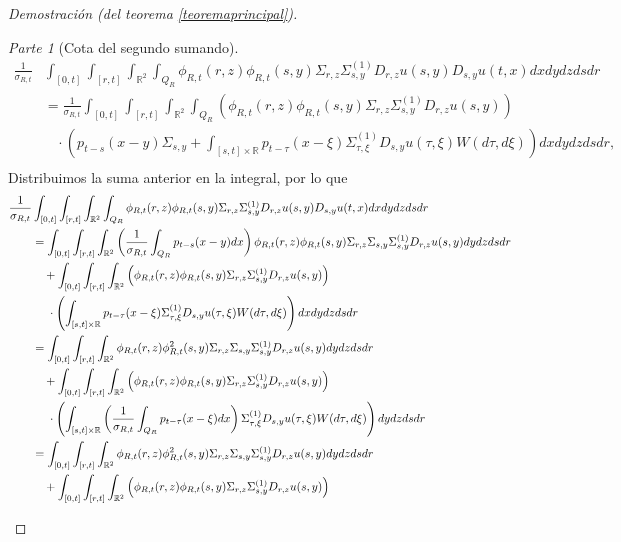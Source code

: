 \documentclass[letterpaper,twoside,12pt]{book}
\newcommand{\R}{\mathbb{R}}
\newcommand{\1}{\mathds{1}}
\theoremstyle{definition}
\theoremstyle{definition}
\theoremstyle{remark}
\newtheorem{proofpart}{Parte}
\theoremstyle{definition}
\theoremstyle{definition}
\theoremstyle{definition}
\theoremstyle{definition}
\theoremstyle{definition}
\begin{document}
\begin{proof}[Demostración (del teorema \ref{teoremaprincipal})]
\begin{proofpart}[Cota del segundo sumando]
   \begin{align*}
      \frac{1}{\sigma_{R,t}}&\int_{[0,t]}\int_{[r,t]}\int_{\R^2}\int_{Q_R}\phi_{R,t}(r,z)\phi_{R,t}(s,y)\Sigma_{r,z}\Sigma^{(1)}_{s,y}D_{r,z}u(s,y)D_{s,y}u(t,x)dx dy dz ds dr\\
      &=\frac{1}{\sigma_{R,t}}\int_{[0,t]}\int_{[r,t]}\int_{\R^2}\int_{Q_R}\left(\phi_{R,t}(r,z)\phi_{R,t}(s,y)\Sigma_{r,z}\Sigma^{(1)}_{s,y}D_{r,z}u(s,y)\right)\\
      & \ \ \ \ \cdot\left(p_{t-s}(x-y)\Sigma_{s,y}+ \int_{[s,t]\times\R} p_{t-\tau}(x-\xi)\Sigma^{(1)}_{\tau,\xi}D_{s,y}u(\tau,\xi)W(d\tau,d\xi)\right)dx dy dz ds dr,\\
   \end{align*}
   Distribuimos la suma anterior en la integral, por lo que 
   \begin{align}
      \frac{1}{\sigma_{R,t}}&\int_{[0,t]}\int_{[r,t]}\int_{\R^2}\int_{Q_R}\phi_{R,t}(r,z)\phi_{R,t}(s,y)\Sigma_{r,z}\Sigma^{(1)}_{s,y}D_{r,z}u(s,y)D_{s,y}u(t,x)dx dy dz ds dr\notag\\
      &=\int_{[0,t]}\int_{[r,t]}\int_{\R^2}\left(\frac{1}{\sigma_{R,t}}\int_{Q_R}p_{t-s}(x-y)dx\right)\phi_{R,t}(r,z)\phi_{R,t}(s,y)\Sigma_{r,z}\Sigma_{s,y}\Sigma^{(1)}_{s,y}D_{r,z}u(s,y)dy dz ds dr\notag\\
      & \ \ \ + \int_{[0,t]}\int_{[r,t]}\int_{\R^2}\left(\phi_{R,t}(r,z)\phi_{R,t}(s,y)\Sigma_{r,z}\Sigma^{(1)}_{s,y}D_{r,z}u(s,y)\right)\notag\\
      &\ \ \ \ \cdot\left(\int_{[s,t]\times\R} p_{t-\tau}(x-\xi)\Sigma^{(1)}_{\tau,\xi}D_{s,y}u(\tau,\xi)W(d\tau,d\xi)\right)dx dy dz ds dr\notag\\
      &=\int_{[0,t]}\int_{[r,t]}\int_{\R^2}\phi_{R,t}(r,z)\phi_{R,t}^2(s,y)\Sigma_{r,z}\Sigma_{s,y}\Sigma^{(1)}_{s,y}D_{r,z}u(s,y)dy dz ds dr\notag\\
      & \ \ \ + \int_{[0,t]}\int_{[r,t]}\int_{\R^2}\left(\phi_{R,t}(r,z)\phi_{R,t}(s,y)\Sigma_{r,z}\Sigma^{(1)}_{s,y}D_{r,z}u(s,y)\right)\notag\\
      &\ \ \ \ \cdot\left(\int_{[s,t]\times\R} \left(\frac{1}{\sigma_{R,t}}\int_{Q_R}p_{t-\tau}(x-\xi)dx\right)\Sigma^{(1)}_{\tau,\xi}D_{s,y}u(\tau,\xi)W(d\tau,d\xi)\right)dy dz ds dr\notag\\
      &=\int_{[0,t]}\int_{[r,t]}\int_{\R^2}\phi_{R,t}(r,z)\phi_{R,t}^2(s,y)\Sigma_{r,z}\Sigma_{s,y}\Sigma^{(1)}_{s,y}D_{r,z}u(s,y)dy dz ds dr\label{pruebasumando3}\\
      &\ \ \ + \int_{[0,t]}\int_{[r,t]}\int_{\R^2}\left(\phi_{R,t}(r,z)\phi_{R,t}(s,y)\Sigma_{r,z}\Sigma^{(1)}_{s,y}D_{r,z}u(s,y)\right)\notag\\

\end{align}
\end{proofpart}
\end{proof}
\end{document}
